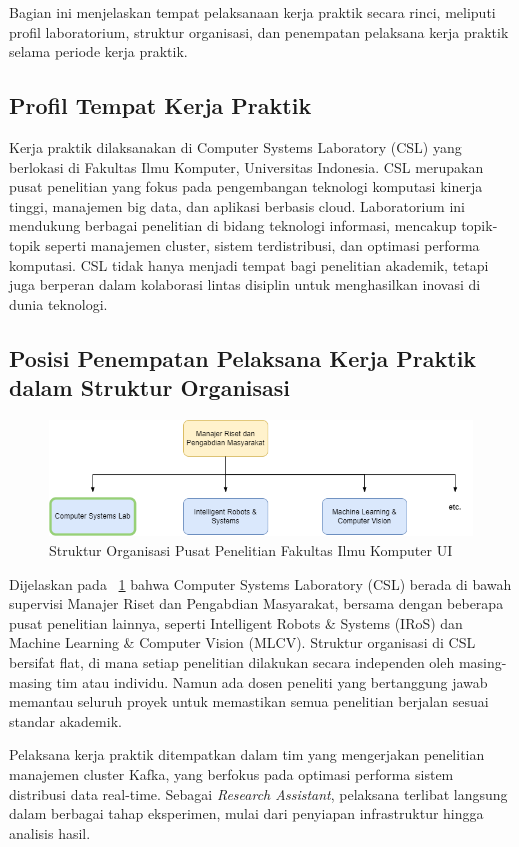 Bagian ini menjelaskan tempat pelaksanaan kerja praktik secara rinci, meliputi profil laboratorium, struktur organisasi, dan penempatan pelaksana kerja praktik selama periode kerja praktik.

\subsection{Profil Tempat Kerja Praktik}
\label{sec:profil}

Kerja praktik dilaksanakan di Computer Systems Laboratory (CSL) yang berlokasi di Fakultas Ilmu Komputer, Universitas Indonesia. CSL merupakan pusat penelitian yang fokus pada pengembangan teknologi komputasi kinerja tinggi, manajemen big data, dan aplikasi berbasis cloud. Laboratorium ini mendukung berbagai penelitian di bidang teknologi informasi, mencakup topik-topik seperti manajemen cluster, sistem terdistribusi, dan optimasi performa komputasi. CSL tidak hanya menjadi tempat bagi penelitian akademik, tetapi juga berperan dalam kolaborasi lintas disiplin untuk menghasilkan inovasi di dunia teknologi.

\subsection{Posisi Penempatan Pelaksana Kerja Praktik dalam Struktur Organisasi}
\label{sec:posisi}

\vspace*{0.8cm}

\begin{figure}
	\centering
	\includegraphics[width=1\textwidth]
	{assets/pics/pacil-org.png}
	\caption{Struktur Organisasi Pusat Penelitian Fakultas Ilmu Komputer UI}
	\label{fig:pacil-org}
\end{figure}

Dijelaskan pada \pic~\ref{fig:pacil-org} bahwa Computer Systems Laboratory (CSL) berada di bawah supervisi Manajer Riset dan Pengabdian Masyarakat, bersama dengan beberapa pusat penelitian lainnya, seperti Intelligent Robots \& Systems (IRoS) dan Machine Learning \& Computer Vision (MLCV). Struktur organisasi di CSL bersifat flat, di mana setiap penelitian dilakukan secara independen oleh masing-masing tim atau individu. Namun ada dosen peneliti yang bertanggung jawab memantau seluruh proyek untuk memastikan semua penelitian berjalan sesuai standar akademik.

Pelaksana kerja praktik ditempatkan dalam tim yang mengerjakan penelitian manajemen cluster Kafka, yang berfokus pada optimasi performa sistem distribusi data real-time. Sebagai \textit{Research Assistant}, pelaksana terlibat langsung dalam berbagai tahap eksperimen, mulai dari penyiapan infrastruktur hingga analisis hasil.
